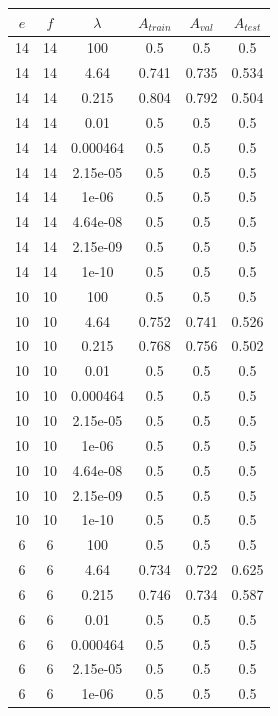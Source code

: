 \begin{itemize}
        \begin{table}[ht]
        \centering
        \begin{tabular}{ |c|c|c|c|c|c| }
        \hline
        $e$ & $f$ & $\lambda$ & $A_{train}$ & $A_{val}$ & $A_{test}$ \\
        \hline
        14 & 14 & 100 & 0.5 & 0.5 & 0.5 \\
        14 & 14 & 4.64 & 0.741 & 0.735 & 0.534 \\
        14 & 14 & 0.215 & 0.804 & 0.792 & 0.504 \\
        14 & 14 & 0.01 & 0.5 & 0.5 & 0.5 \\
        14 & 14 & 0.000464 & 0.5 & 0.5 & 0.5 \\
        14 & 14 & 2.15e-05 & 0.5 & 0.5 & 0.5 \\
        14 & 14 & 1e-06 & 0.5 & 0.5 & 0.5 \\
        14 & 14 & 4.64e-08 & 0.5 & 0.5 & 0.5 \\
        14 & 14 & 2.15e-09 & 0.5 & 0.5 & 0.5 \\
        14 & 14 & 1e-10 & 0.5 & 0.5 & 0.5 \\
        10 & 10 & 100 & 0.5 & 0.5 & 0.5 \\
        10 & 10 & 4.64 & 0.752 & 0.741 & 0.526 \\
        10 & 10 & 0.215 & 0.768 & 0.756 & 0.502 \\
        10 & 10 & 0.01 & 0.5 & 0.5 & 0.5 \\
        10 & 10 & 0.000464 & 0.5 & 0.5 & 0.5 \\
        10 & 10 & 2.15e-05 & 0.5 & 0.5 & 0.5 \\
        10 & 10 & 1e-06 & 0.5 & 0.5 & 0.5 \\
        10 & 10 & 4.64e-08 & 0.5 & 0.5 & 0.5 \\
        10 & 10 & 2.15e-09 & 0.5 & 0.5 & 0.5 \\
        10 & 10 & 1e-10 & 0.5 & 0.5 & 0.5 \\
        6 & 6 & 100 & 0.5 & 0.5 & 0.5 \\
        6 & 6 & 4.64 & 0.734 & 0.722 & 0.625 \\
        6 & 6 & 0.215 & 0.746 & 0.734 & 0.587 \\
        6 & 6 & 0.01 & 0.5 & 0.5 & 0.5 \\
        6 & 6 & 0.000464 & 0.5 & 0.5 & 0.5 \\
        6 & 6 & 2.15e-05 & 0.5 & 0.5 & 0.5 \\
        6 & 6 & 1e-06 & 0.5 & 0.5 & 0.5 \\

\end{tabular}
\end{table}
\end{itemize}
